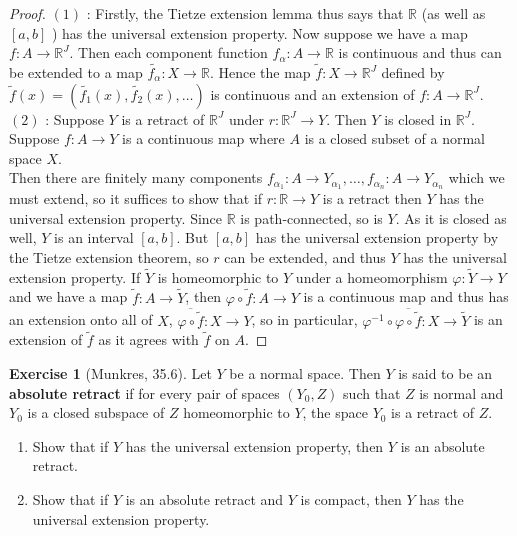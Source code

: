 \documentclass[reqno]{amsart}
\theoremstyle{plain}%
\theoremstyle{definition}
\newtheorem{exercise}[theorem]{Exercise}
\theoremstyle{remark}
\begin{document}
\begin{proof}
   $(1)$ : Firstly, the Tietze extension lemma thus says that
    $\mathbb{R}$ (as well as $[a,b]$ ) has the universal extension property.
    Now suppose we have a map $f  \colon A \to \mathbb{R}^{J}$. Then each
    component function $f_{\alpha}  \colon A \to \mathbb{R}$ is continuous
    and thus can be extended to a map $\tilde{f_{\alpha}}  \colon X \to
    \mathbb{R}$. Hence the map
    $\tilde{f}  \colon X \to \mathbb{R}^{J}$ defined by
    $\tilde{f}(x) = \left( \tilde{f_1}(x), \tilde{f_2}(x), \ldots \right) $ is 
    continuous and an extension of $f  \colon A \to \mathbb{R}^{J}$.\\
    \linebreak
    $(2)$ : Suppose $Y$ is a retract of $\mathbb{R}^{J} $ under
    $r  \colon \mathbb{R}^{J} \to Y$. Then $Y$ is closed in
    $\mathbb{R}^{J}$. Suppose $f  \colon
    A \to Y$ is a continuous map where $A$ is a closed subset of
    a normal space $X$.\\
    Then there are finitely many components $f_{\alpha_1}  \colon
    A \to Y_{\alpha_1},\ldots, f_{\alpha_n}  \colon A \to 
    Y_{\alpha_n}$ which we must extend, so it suffices to show that
    if $r  \colon \mathbb{R} \to Y$ is a retract then $Y$ has the universal
    extension property. Since $\mathbb{R}$ is path-connected, so is $Y$.
    As it is closed as well, $Y$ is an interval $\left[ a,b \right] $.
    But $\left[ a,b \right] $ has the universal extension property by
    the Tietze extension theorem, so
    $r$ can be extended, and thus $Y$ has the universal extension property. 
    If $\tilde{Y}$ is homeomorphic to $ Y$ under a homeomorphism
    $\varphi  \colon \tilde{Y} \to Y$ and we have a map
    $\tilde{f}  \colon A \to \tilde{Y}$, then
    $\varphi \circ \tilde{f}  \colon A \to Y$ is a continuous map and thus 
    has an extension onto all of  $X$, $\overline{\varphi \circ \tilde{f}} \colon
    X \to Y$, so in particular,
    $\varphi^{-1} \circ \overline{\varphi \circ \tilde{f}} \colon
    X \to \tilde{Y}$ is an extension of $\tilde{f}$ as it agrees with
    $\tilde{f}$ on $A$.
\end{proof}

\begin{exercise}[Munkres, 35.6]
    Let $Y$ be a normal space. Then $Y$ is said to be an \textbf{absolute
    retract} if for every pair of spaces $\left( Y_0, Z \right) $ such that
    $Z$ is normal and $Y_0$ is a closed subspace of $Z$ homeomorphic to $Y$,
    the space $Y_0$ is a retract of $Z$.
    \begin{enumerate}
        \item Show that if $Y$ has the universal extension property, then
            $Y$ is an absolute retract.
        \item Show that if $Y$ is an absolute retract and $Y$ is compact, then
            $Y$ has the universal extension property.
    \end{enumerate}
\end{exercise}
\end{document}
